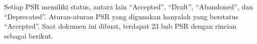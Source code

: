 Setiap PSR memiliki status, antara lain ``Accepted'', ``Draft'', ``Abandoned'', dan ``Deprecated''. Aturan-aturan PSR yang digunakan hanyalah yang berstatus ``Accepted''. Saat dokumen ini dibuat, terdapat 23 bab PSR dengan rincian sebagai berikut.
\begin{comment}
\begin{enumerate}
	\item{Accepted}
	\begin{itemize}
		\item PSR-01: Basic Coding Standard
		\item PSR-03: Logger Interface
		\item PSR-04: Autoloading Standard
		\item PSR-06: Caching Interface
		\item PSR-07: HTTP Message Interface
		\item PSR-11: Container Interface
		\item PSR-12: Extended Coding Style Guide
		\item PSR-13: Hypermedia Links
		\item PSR-14: Event Dispatcher
		\item PSR-15: HTTP Handlers
		\item PSR-16: Simple Cache
		\item PSR-17: HTTP Factories
		\item PSR-18: HTTP Client
		\item PSR-20: Clock
	\end{itemize}

	\item{Draft}
	\begin{itemize}
		\item PSR-05: PHPDoc Standard
		\item PSR-19: PHPDoc Tags
		\item PSR-21: Internationalization
		\item PSR-22: Application Tracing
	\end{itemize}
	
	\item{Abandoned}
	\begin{itemize}
		\item PSR-08: Huggable Interface
		\item PSR-09: Security Advisories
		\item PSR-10: Security Reporting Process
	\end{itemize}
	
	\item{Deprecated}
	\begin{itemize}
		\item PSR-00: Autoloading Standard
		\item PSR-02: Coding Style Guide
	\end{itemize}
	
	
\end{enumerate}
\end{comment}

